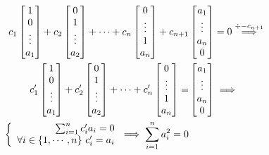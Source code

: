 \begin{align*}
    c_1\begin{bmatrix}
        1\\
        0\\
        \vdots\\
        a_1
    \end{bmatrix}
    + c_2\begin{bmatrix}
        0\\
        1\\
        \vdots\\
        a_2
    \end{bmatrix}
    + \cdots + c_n\begin{bmatrix}
        0\\
        \vdots\\
        1\\
        a_n
    \end{bmatrix}
    +
    c_{n+1}&\begin{bmatrix}
        a_1\\
        \vdots\\
        a_n\\
        0
    \end{bmatrix}
    = 0 \stackrel{\div -c_{n+1}}{\implies} \\
    c_1'\begin{bmatrix}
        1\\
        0\\
        \vdots\\
        a_1
    \end{bmatrix}
    + c_2'\begin{bmatrix}
        0\\
        1\\
        \vdots\\
        a_2
    \end{bmatrix}
    + \cdots + c_n'\begin{bmatrix}
        0\\
        \vdots\\
        1\\
        a_n
    \end{bmatrix}
    =
    &\begin{bmatrix}
        a_1\\
        \vdots\\
        a_n\\
        0
    \end{bmatrix}
    \implies\\
    \quad
    \left\{\begin{array}{r@{\mskip\thickmuskip}l}
        \sum_{i=1}^{n} c_i' a_i = 0\\
        \forall i \in \{1,\cdots,n\} ~ c_i' = a_i
    \end{array}\right.
    \implies
    \sum_{i=1}^{n} a_i^2 = 0
\end{align*}
